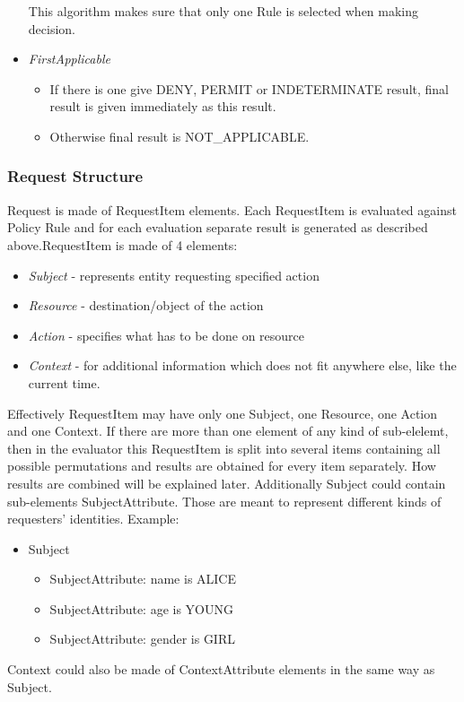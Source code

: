 \documentclass{article}                            %
\begin{document}
\begin{itemize}
This algorithm makes sure that only one Rule is selected when making decision.

    \item  \emph{FirstApplicable}

    \begin{itemize}
        \item If there is one give DENY, PERMIT or INDETERMINATE result, final result is given immediately as this result.
        \item Otherwise final result is NOT\_APPLICABLE.
    \end{itemize}

\end{itemize}


\subsubsection{Request Structure} %
\label{subsubsec:request_structure}

Request is made of RequestItem elements. Each RequestItem is evaluated against Policy Rule and for each evaluation separate result is generated as described above.RequestItem is made of 4 elements:
    \begin{itemize}
        \item \emph{Subject} - represents entity requesting specified action
        \item \emph{Resource} - destination/object of the action
        \item \emph{Action} - specifies what has to be done on resource
        \item \emph{Context} - for additional information which does not fit anywhere else, like the current time.
    \end{itemize}

Effectively RequestItem may have only one Subject, one Resource, one Action and one Context. If there are more than one element of any kind of sub-elelemt, then in the evaluator this RequestItem is split into several items containing all possible permutations and results are obtained for every item separately. How results are combined will be explained later.
Additionally Subject could contain sub-elements SubjectAttribute. Those are meant to represent different kinds of requesters' identities. Example:

    \begin{itemize}
        \item Subject
        \begin{itemize}     
            \item SubjectAttribute: name is ALICE
            \item SubjectAttribute: age is YOUNG
            \item SubjectAttribute: gender is GIRL
        \end{itemize}
    \end{itemize}
Context could also be made of ContextAttribute elements in the same way as Subject.
\end{document}
